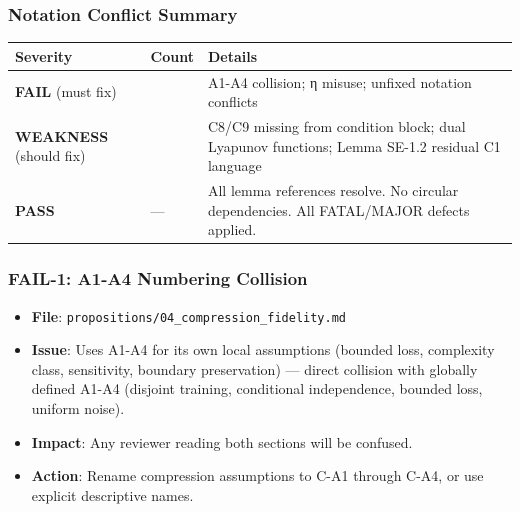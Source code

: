 \documentclass[
  12pt,
]{ctexart}
\providecommand{\tightlist}{%
  \setlength{\itemsep}{0pt}\setlength{\parskip}{0pt}}
\begin{document}
\subsubsection{Notation Conflict
Summary}\label{notation-conflict-summary}

\begin{longtable}[]{@{}
  >{\raggedright\arraybackslash}p{}
  >{\raggedright\arraybackslash}p{}
  >{\raggedright\arraybackslash}p{}@{}}
\toprule\noalign{}
\begin{minipage}[b]{\linewidth}\raggedright
Severity
\end{minipage} & \begin{minipage}[b]{\linewidth}\raggedright
Count
\end{minipage} & \begin{minipage}[b]{\linewidth}\raggedright
Details
\end{minipage} \\
\midrule\noalign{}
\endhead
\bottomrule\noalign{}
\endlastfoot
\textbf{FAIL} (must fix) & 3 & A1-A4 collision; η misuse; unfixed
notation conflicts \\
\textbf{WEAKNESS} (should fix) & 3 & C8/C9 missing from condition block;
dual Lyapunov functions; Lemma SE-1.2 residual C1 language \\
\textbf{PASS} & --- & All lemma references resolve. No circular
dependencies. All FATAL/MAJOR defects applied. \\
\end{longtable}

\subsubsection{FAIL-1: A1-A4 Numbering
Collision}\label{fail-1-a1-a4-numbering-collision}

\begin{itemize}
\tightlist
\item
  \textbf{File}: \texttt{propositions/04\_compression\_fidelity.md}
\item
  \textbf{Issue}: Uses A1-A4 for its own local assumptions (bounded
  loss, complexity class, sensitivity, boundary preservation) --- direct
  collision with globally defined A1-A4 (disjoint training, conditional
  independence, bounded loss, uniform noise).
\item
  \textbf{Impact}: Any reviewer reading both sections will be confused.
\item
  \textbf{Action}: Rename compression assumptions to C-A1 through C-A4,
  or use explicit descriptive names.
\end{itemize}
\end{document}
